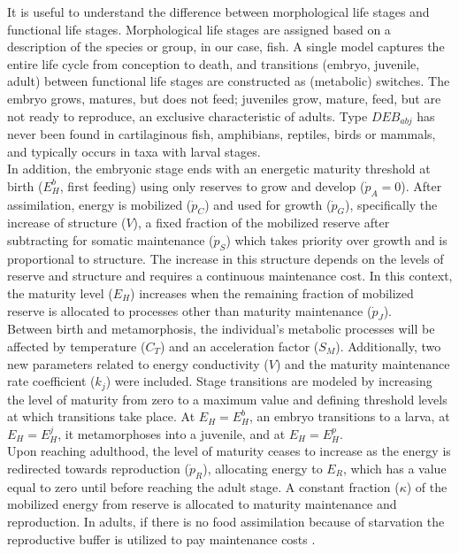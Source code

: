 It is useful to understand the difference between morphological life stages and functional life stages. Morphological life stages are assigned based on a description of the species or group, in our case, fish. A single model captures the entire life cycle from conception to death, and transitions (embryo, juvenile, adult) between functional life stages are constructed as (metabolic) switches. The embryo grows, matures, but does not feed; juveniles grow, mature, feed, but are not ready to reproduce, an exclusive characteristic of adults. Type $DEB_{abj}$ has never been found in cartilaginous fish, amphibians, reptiles, birds or mammals, and typically occurs in taxa with larval stages.\\

In addition, the embryonic stage ends with an energetic maturity threshold at birth ($E_{H}^{b}$, first feeding) using only reserves to grow and develop ($\dot{p}_{A} = 0$). After assimilation, energy is mobilized ($\dot{p}_{C}$) and used for growth ($\dot{p}_{G}$), specifically the increase of structure ($V$), a fixed fraction of the mobilized reserve after subtracting for somatic maintenance ($\dot{p}_{S}$) which takes priority over growth and is proportional to structure. The increase in this structure depends on the levels of reserve and structure and requires a continuous maintenance cost. In this context, the maturity level ($E_{H}$) increases when the remaining fraction of mobilized reserve is allocated to processes other than maturity maintenance ($\dot{p}_{J}$).\\

Between birth and metamorphosis, the individual's metabolic processes will be affected by temperature ($C_{T}$) and an acceleration factor ($S_{M}$). Additionally, two new parameters related to energy conductivity ($V$) and the maturity maintenance rate coefficient ($k_{j}$) were included. Stage transitions are modeled by increasing the level of maturity from zero to a maximum value and defining threshold levels at which transitions take place. At $E_{H} = E_{H}^{b}$, an embryo transitions to a larva, at $E_{H} = E_{H}^{j}$, it metamorphoses into a juvenile, and at $E_{H} = E_{H}^{p}$.\\

Upon reaching adulthood, the level of maturity ceases to increase as the energy is redirected towards reproduction ($\dot{p}_{R}$), allocating energy to $E_{R}$, which has a value equal to zero until before reaching the adult stage. A constant fraction ($\kappa$) of the mobilized energy from reserve is allocated to maturity maintenance and reproduction. In adults, if there is no food assimilation because of starvation the reproductive buffer is utilized to pay maintenance costs \citep{BrosLlor2016,GattPeti2017,MenuPecq2023}.\\

